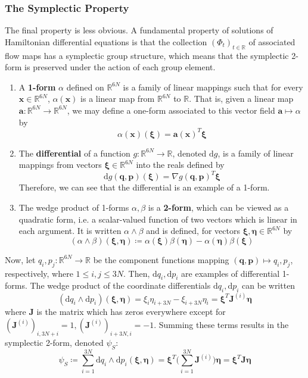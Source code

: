 \documentclass{article}
\theoremstyle{remark}
\theoremstyle{definition}
\begin{document}
\subsubsection{The Symplectic Property}
The final property is less obvious. A fundamental property of solutions of Hamiltonian differential equations is that the collection $(\Phi_t)_{t \in \mathbb{R}}$ of associated flow maps has a symplectic group structure, which means that the symplectic 2-form is preserved under the action of each group element. 
\begin{enumerate}
    \item A \textbf{1-form} $\alpha$ defined on $\mathbb{R}^{6N}$ is a family of linear mappings such that for every $\mathbf{x} \in \mathbb{R}^{6N}$, $\alpha(\mathbf{x})$ is a linear map from $\mathbb{R}^{6N}$ to $\mathbb{R}$. That is, given a linear map $\mathbf{a}: \mathbb{R}^{6N} \longrightarrow \mathbb{R}^{6N}$, we may define a one-form associated to this vector field $\mathbf{a} \mapsto \alpha$ by 
    \[\alpha(\mathbf{x}) (\boldsymbol{\xi}) = \mathbf{a} (\mathbf{x})^T \boldsymbol{\xi}\] 
    \item The \textbf{differential} of a function $g: \mathbb{R}^{6N} \longrightarrow \mathbb{R}$, denoted $\mathrm{d}g$, is a family of linear mappings from vectors $\boldsymbol{\xi} \in \mathbb{R}^{6N}$ into the reals defined by 
    \[\mathrm{d}g (\mathbf{q}, \mathbf{p}) (\boldsymbol{\xi}) = \nabla g(\mathbf{q}, \mathbf{p})^T \boldsymbol{\xi}\]
    Therefore, we can see that the differential is an example of a 1-form. 
    \item The wedge product of 1-forms $\alpha, \beta$ is a \textbf{2-form}, which can be viewed as a quadratic form, i.e. a scalar-valued function of two vectors which is linear in each argument. It is written $\alpha \wedge \beta$ and is defined, for vectors $\boldsymbol{\xi}, \boldsymbol{\eta} \in \mathbb{R}^{6N}$ by 
    \[(\alpha \wedge \beta)(\boldsymbol{\xi}, \boldsymbol{\eta}) \coloneqq \alpha(\boldsymbol{\xi}) \beta(\boldsymbol{\eta}) - \alpha(\boldsymbol{\eta}) \beta(\boldsymbol{\xi})\]
\end{enumerate}
Now, let $q_i, p_j: \mathbb{R}^{6N} \longrightarrow \mathbb{R}$ be the component functions mapping $(\mathbf{q}, \mathbf{p}) \mapsto q_i, p_j$, respectively, where $1 \leq i, j \leq 3N$. Then, $\mathrm{d} q_i, \mathrm{d} p_i$ are examples of differential 1-forms. The wedge product of the coordinate differentials $\mathrm{d}q_i, \mathrm{d} p_i$ can be written
\[(\mathrm{d}q_i \wedge \mathrm{d} p_i)(\boldsymbol{\xi}, \boldsymbol{\eta}) = \xi_i\eta_{i + 3N} - \xi_{i + 3N} \eta_i = \boldsymbol{\xi}^T \mathbf{J}^{(i)} \boldsymbol{\eta}\]
where $\mathbf{J}$ is the matrix which has zeros everywhere except for $(\mathbf{J}^{(i)})_{i, 3N + i} = 1, (\mathbf{J}^{(i)})_{i + 3N, i} = -1$. Summing these terms results in the symplectic 2-form, denoted $\psi_S$: 
\[\psi_S \coloneqq \sum_{i=1}^{3N} \mathrm{d}q_i \wedge \mathrm{d} p_i (\boldsymbol{\xi}, \boldsymbol{\eta}) = \boldsymbol{\xi}^T \bigg( \sum_{i=1}^{3N} \mathbf{J}^{(i)} \bigg) \boldsymbol{\eta} = \boldsymbol{\xi}^T \mathbf{J} \boldsymbol{\eta}\]
\end{document}
